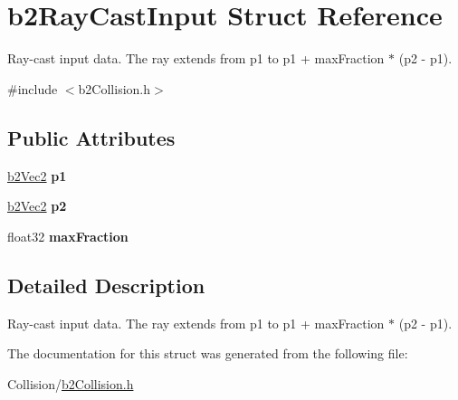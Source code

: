 \hypertarget{structb2RayCastInput}{}\section{b2\+Ray\+Cast\+Input Struct Reference}
\label{structb2RayCastInput}


Ray-\/cast input data. The ray extends from p1 to p1 + max\+Fraction $\ast$ (p2 -\/ p1).  




{\ttfamily \#include $<$b2\+Collision.\+h$>$}

\subsection*{Public Attributes}
\begin{DoxyCompactItemize}
\item 
\mbox{\label{structb2RayCastInput_a7254a7062422833b1124fa464ab4caf3}} 
\mbox{\hyperlink{structb2Vec2}{b2\+Vec2}} {\bfseries p1}
\item 
\mbox{\label{structb2RayCastInput_a850102c843469781a3a627c871043d0b}} 
\mbox{\hyperlink{structb2Vec2}{b2\+Vec2}} {\bfseries p2}
\item 
\mbox{\label{structb2RayCastInput_acb5c88e0ef2c3716a1334611522ab0b2}} 
float32 {\bfseries max\+Fraction}
\end{DoxyCompactItemize}


\subsection{Detailed Description}
Ray-\/cast input data. The ray extends from p1 to p1 + max\+Fraction $\ast$ (p2 -\/ p1). 

The documentation for this struct was generated from the following file\+:\begin{DoxyCompactItemize}
\item 
Collision/\mbox{\hyperlink{b2Collision_8h}{b2\+Collision.\+h}}\end{DoxyCompactItemize}

